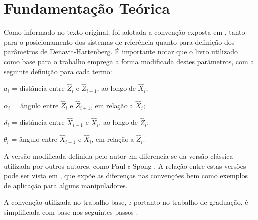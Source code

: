 \chapter{Fundamentação Teórica}

\label{sec:fundamentos}

Como informado no texto original, foi adotada a convenção exposta em \cite{craig2009introduction}, tanto
para o posicionamento dos sistemas de referência quanto para definição dos parâmetros de Denavit-Hartenberg.
É importante notar que o livro utilizado como base para o trabalho emprega a forma modificada destes 
parâmetros, com a seguinte definição para cada termo:

\begin{itemize}
    \begin{centering}
    \item[] $a_i$ = distância entre $\hat{Z}_i$ e $\hat{Z}_{i+1}$, ao longo de $\hat{X}_i$;
    \item[] $\alpha_i$ = ângulo entre $\hat{Z}_i$ e $\hat{Z}_{i+1}$, em relação a $\hat{X}_i$;
    \item[] $d_i$ = distância entre $\hat{X}_{i-1}$ e $\hat{X}_i$, ao longo de $\hat{Z}_i$;
    \item[] $\theta_i$ = ângulo entre $\hat{X}_{i-1}$ e $\hat{X}_i$, em relação a $\hat{Z}_i$.
    \par\end{centering}
\end{itemize}

A versão modificada definida pelo autor em \cite{craig2009introduction} diferencia-se da versão 
clássica utilizada por outros autores, como Paul \cite{paul1981robot} e Spong \cite{spong2008robot}.
A relação entre estas versões pode ser vista em \cite{reddy2014difference}, que expõe as diferenças nas
convenções bem como exemplos de aplicação para alguns manipuladores.

A convenção utilizada no trabalho base, e portanto no trabalho de graduação, é simplificada com 
base nos seguintes passos \cite{craig2009introduction}:


